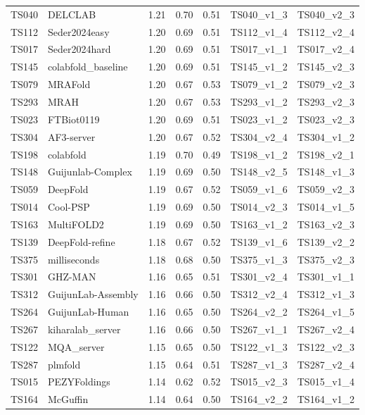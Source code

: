 \begin{longtable}{lllllll}
TS040 & DELCLAB & 1.21 & 0.70 & 0.51 & TS040\_v1\_3 & TS040\_v2\_3 \\ 
TS112 & Seder2024easy & 1.20 & 0.69 & 0.51 & TS112\_v1\_4 & TS112\_v2\_4 \\ 
TS017 & Seder2024hard & 1.20 & 0.69 & 0.51 & TS017\_v1\_1 & TS017\_v2\_4 \\ 
TS145 & colabfold\_baseline & 1.20 & 0.69 & 0.51 & TS145\_v1\_2 & TS145\_v2\_3 \\ 
TS079 & MRAFold & 1.20 & 0.67 & 0.53 & TS079\_v1\_2 & TS079\_v2\_3 \\ 
TS293 & MRAH & 1.20 & 0.67 & 0.53 & TS293\_v1\_2 & TS293\_v2\_3 \\ 
TS023 & FTBiot0119 & 1.20 & 0.69 & 0.51 & TS023\_v1\_2 & TS023\_v2\_3 \\ 
TS304 & AF3-server & 1.20 & 0.67 & 0.52 & TS304\_v2\_4 & TS304\_v1\_2 \\ 
TS198 & colabfold & 1.19 & 0.70 & 0.49 & TS198\_v1\_2 & TS198\_v2\_1 \\ 
TS148 & Guijunlab-Complex & 1.19 & 0.69 & 0.50 & TS148\_v2\_5 & TS148\_v1\_3 \\ 
TS059 & DeepFold & 1.19 & 0.67 & 0.52 & TS059\_v1\_6 & TS059\_v2\_3 \\ 
TS014 & Cool-PSP & 1.19 & 0.69 & 0.50 & TS014\_v2\_3 & TS014\_v1\_5 \\ 
TS163 & MultiFOLD2 & 1.19 & 0.69 & 0.50 & TS163\_v1\_2 & TS163\_v2\_3 \\ 
TS139 & DeepFold-refine & 1.18 & 0.67 & 0.52 & TS139\_v1\_6 & TS139\_v2\_2 \\ 
TS375 & milliseconds & 1.18 & 0.68 & 0.50 & TS375\_v1\_3 & TS375\_v2\_3 \\ 
TS301 & GHZ-MAN & 1.16 & 0.65 & 0.51 & TS301\_v2\_4 & TS301\_v1\_1 \\ 
TS312 & GuijunLab-Assembly & 1.16 & 0.66 & 0.50 & TS312\_v2\_4 & TS312\_v1\_3 \\ 
TS264 & GuijunLab-Human & 1.16 & 0.65 & 0.50 & TS264\_v2\_2 & TS264\_v1\_5 \\ 
TS267 & kiharalab\_server & 1.16 & 0.66 & 0.50 & TS267\_v1\_1 & TS267\_v2\_4 \\ 
TS122 & MQA\_server & 1.15 & 0.65 & 0.50 & TS122\_v1\_3 & TS122\_v2\_3 \\ 
TS287 & plmfold & 1.15 & 0.64 & 0.51 & TS287\_v1\_3 & TS287\_v2\_4 \\ 
TS015 & PEZYFoldings & 1.14 & 0.62 & 0.52 & TS015\_v2\_3 & TS015\_v1\_4 \\ 
TS164 & McGuffin & 1.14 & 0.64 & 0.50 & TS164\_v2\_2 & TS164\_v1\_2 \\ 

\end{longtable}
